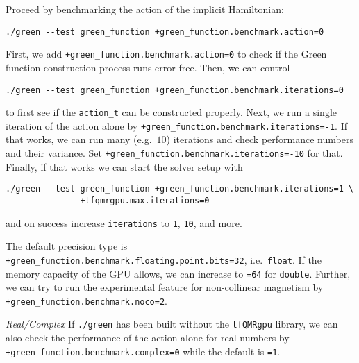 \documentclass[oribibl]{llncs}
\newcommand{\ttt}[1]{\texttt{#1}}
\begin{document}
%
\noindent
Proceed by benchmarking the action of the implicit Hamiltonian:
\begin{verbatim}
./green --test green_function +green_function.benchmark.action=0
\end{verbatim}
First, we add \ttt{+green\_function.benchmark.action=0} to check if the Green function construction process runs error-free.
Then, we can control 
\begin{verbatim}
./green --test green_function +green_function.benchmark.iterations=0
\end{verbatim}
to first see if the \ttt{action\_t} can be constructed properly.
Next, we run a single iteration of the action alone by \ttt{+green\_function.benchmark.iterations=-1}.
If that works, we can run many (e.g.~$10$) iterations and check performance numbers and their variance.
Set \ttt{+green\_function.benchmark.iterations=-10} for that.
\noindent
Finally, if that works we can start the solver setup with 
\begin{verbatim}
./green --test green_function +green_function.benchmark.iterations=1 \
			   +tfqmrgpu.max.iterations=0
\end{verbatim}
and on success increase \ttt{iterations} to \ttt{1}, \ttt{10}, and more.

%
\noindent
The default precision type is \ttt{+green\_function.benchmark.floating.point.bits=32}, i.e.~\ttt{float}.
If the memory capacity of the \ac{GPU} allows, we can increase to \ttt{=64} for \ttt{double}.
Further, we can try to run the experimental feature for non-collinear magnetism by \ttt{+green\_function.benchmark.noco=2}.

%
\noindent
\emph{Real/Complex} If \ttt{./green} has been built without the \ttt{tfQMRgpu} library,
we can also check the performance of the action alone for real numbers by \ttt{+green\_function.benchmark.complex=0} while the default is \ttt{=1}.
\end{document}
